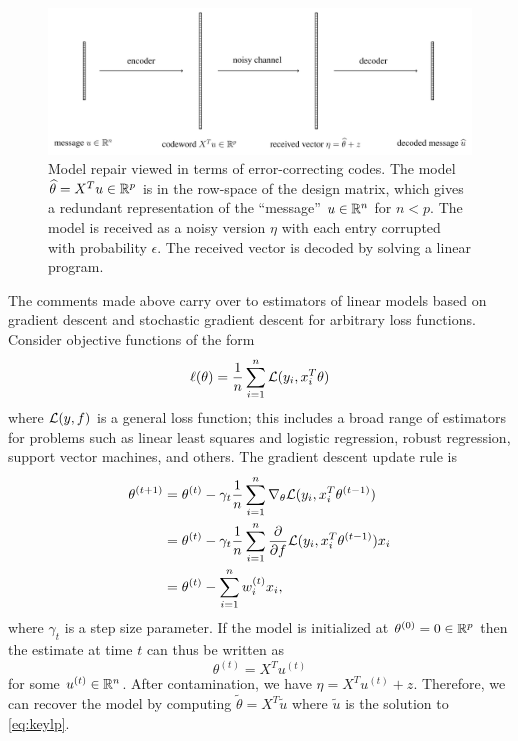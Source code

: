 \begin{figure}[t]
  \includegraphics[width=1.0\textwidth]{fig/code}
  \caption{Model repair viewed in terms of error-correcting codes. The model $\widehat\theta = X^T u\in\mathbb{R}^p$ is in the row-space of the design matrix, which gives a redundant representation of the ``message'' $u\in\mathbb{R}^n$ for $n < p$. The model is received as a noisy version $\eta$ with each entry corrupted with probability $\epsilon$. The received vector is decoded by solving a linear program.}
  \label{fig:code}
\end{figure}

The comments made above carry over to estimators of linear models based on gradient descent and stochastic gradient descent for arbitrary loss functions. Consider objective functions of the form
\begin{equation}
  \ell(\theta) = \frac{1}{n} \sum_{i=1}^n \L(y_i, x_i^T \theta)\label{eq:gen-obj}
\end{equation}
where ${\mathcal L}(y,f)$ is a general loss function; this includes
a broad range of estimators for problems such as linear least squares and logistic regression, robust regression, support vector machines, and others. The gradient descent update rule is
\begin{align}
  \theta^{(t+1)} &= \theta^{(t)} - \gamma_t \frac{1}{n} \sum_{i=1}^n \nabla_\theta \L(y_i, x_i^T \theta^{(t-1)}) \\
  &= \theta^{(t)} - \gamma_t \frac{1}{n} \sum_{i=1}^n \frac{\partial}{\partial f} \L(y_i, x_i^T \theta^{(t-1)}) x_i \\
  &= \theta^{(t)} - \sum_{i=1}^n w_i^{(t)} x_i,
\end{align}
where $\gamma_t$ is a step size parameter. If the model is initialized at $\theta^{(0)}= 0\in\mathbb{R}^p$ then the estimate at time $t$ can thus be written as
\begin{equation}
  \theta^{(t)} = X^T u^{(t)}
\end{equation}
for some $u^{(t)}\in \mathbb{R}^n$. After contamination, we have $\eta = X^T u^{(t)} + z$. Therefore, we can recover the model
by computing  $\tilde\theta = X^T \tilde u$ where $\tilde u$ is the solution to \eqref{eq:keylp}.


